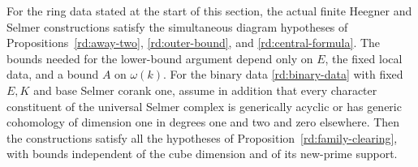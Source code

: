 \begin{proposition}
\label{rd:assembly}
For the ring data stated at the start of this section, the actual
finite Heegner and Selmer constructions satisfy the simultaneous
diagram hypotheses of Propositions~\ref{rd:away-two},
\ref{rd:outer-bound}, and \ref{rd:central-formula}.
The bounds needed for the lower-bound argument depend only on
\(E\), the fixed local data, and a bound \(A\) on \(\omega(k)\).
For the binary data \eqref{rd:binary-data} with fixed \(E,K\)
and base Selmer corank one, assume in addition that every
character constituent of the universal Selmer complex is generically acyclic
or has generic cohomology of
dimension one in degrees one and two and zero elsewhere.
Then the constructions satisfy all the hypotheses of
Proposition~\ref{rd:family-clearing}, with
bounds independent of the cube dimension and of its
new-prime support.
\end{proposition}


